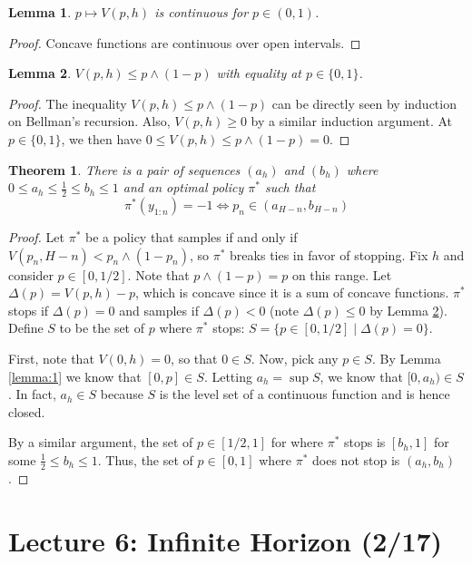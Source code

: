 \documentclass[pdftex,letterpaper,11pt]{article}
\newtheorem{lemma}{Lemma}
\newtheorem{theorem}{Theorem}
\theoremstyle{definition}
\theoremstyle{definition}
\theoremstyle{definition}
\begin{document}
\begin{lemma}
	$p \mapsto V(p,h)$ is continuous for $p \in (0,1)$.
\end{lemma}
\begin{proof}
	Concave functions are continuous over open intervals.
\end{proof}

\begin{lemma}\label{lemma:4}
	$V(p,h) \leq p \wedge (1-p)$ with equality at $p \in \{0,1\}$.
\end{lemma}
\begin{proof}
	The inequality $V(p,h) \leq p \wedge (1-p)$ can be directly seen by induction on Bellman's recursion. Also, $V(p,h) \geq 0$ by a similar induction argument. At $p \in \{0,1\}$, we then have $0 \leq V(p,h) \leq p \wedge (1-p) = 0$.
\end{proof}

\begin{theorem}
	There is a pair of sequences $(a_h)$ and $(b_h)$ where $0 \leq a_h \leq \frac{1}{2} \leq b_h \leq 1$ and an optimal policy $\pi^*$ such that
	\[\pi^*(y_{1:n}) = -1 \iff p_n \in (a_{H-n}, b_{H-n})\]
\end{theorem}
\begin{proof}
	Let $\pi^*$ be a policy that samples if and only if $V(p_n, H-n) < p_n \wedge (1-p_n)$, so $\pi^*$ breaks ties in favor of stopping. Fix $h$ and consider $p \in [0, 1/2]$. Note that $p \wedge (1-p) = p$ on this range. Let $\Delta(p) = V(p,h) - p$, which is concave since it is a sum of concave functions. $\pi^*$ stops if $\Delta(p) = 0$ and samples if $\Delta(p) < 0$ (note $\Delta(p) \leq 0$ by Lemma \ref{lemma:4}). Define $S$ to be the set of $p$ where $\pi^*$ stops: $S = \{p \in [0,1/2] \mid \Delta(p) = 0\}$.

	First, note that $V(0,h) = 0$, so that $0 \in S$. Now, pick any $p \in S$. By Lemma \ref{lemma:1} we know that $[0,p] \in S$. Letting $a_h = \sup S$, we know that $[0, a_h) \in S$. In fact, $a_h \in S$ because $S$ is the level set of a continuous function and is hence closed.

	By a similar argument, the set of $p \in [1/2, 1]$ for where $\pi^*$ stops is $[b_h, 1]$ for some $\frac{1}{2} \leq b_h \leq 1$. Thus, the set of $p \in [0,1]$ where $\pi^*$ does not stop is $(a_h, b_h)$.
\end{proof}

\section*{Lecture 6: Infinite Horizon (2/17)}
\end{document}
